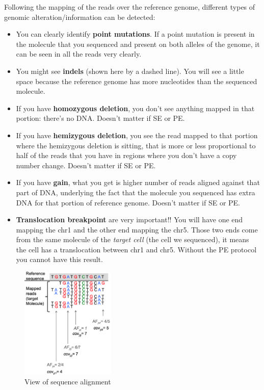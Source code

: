 Following the mapping of the reads over the reference genome, different types of
genomic alteration/information can be detected:

\begin{itemize}
  
  \item You can clearly identify \textbf{point mutations}. If a point mutation
  is present in the molecule that you sequenced and present on both alleles of
  the genome, it can be seen in all the reads very clearly.
  
  \item You might see \textbf{indels} (shown here by a dashed line). You will
  see a little space because the reference genome has more nucleotides than the
  sequenced molecule.
  
  \item If you have \textbf{homozygous deletion}, you don't see anything mapped
  in that portion: there's no DNA. Doesn't matter if SE or PE.
  
  \item If you have \textbf{hemizygous deletion}, you see the read mapped to
  that portion where the hemizygous deletion is sitting, that is more or less
  proportional to half of the reads that you have in regions where you don't
  have a copy number change. Doesn't matter if SE or PE.
  
  \item If you have \textbf{gain}, what you get is higher number of reads
  aligned against that part of DNA, underlying the fact that the molecule you
  sequenced has extra DNA for that portion of reference genome. Doesn't matter
  if SE or PE.

  \item \textbf{Translocation breakpoint} are very important!! You will have one
  end mapping the chr1 and the other end mapping the chr5. Those two ends come
  from the same molecule of the \emph{target cell} (the cell we sequenced), it
  means the cell has a translocation between chr1 and chr5. Without the PE
  protocol you cannot have this result.
  
\end{itemize}

\begin{figure}[H]
  \includegraphics[width=0.4\textwidth]{image14.png}
  \centering
  \caption{View of sequence alignment} \label{fig: coverage and allele
  frequency}
\end{figure}


